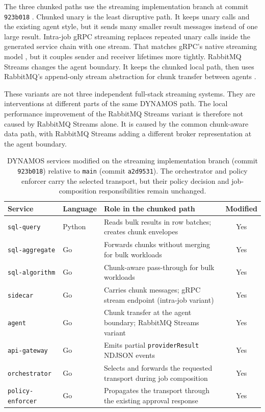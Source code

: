 The three chunked paths use the streaming implementation branch at commit \texttt{923b018} \cite{dynamosStreamingCommit2026}. Chunked unary is the least disruptive path. It keeps unary calls and the existing agent style, but it sends many smaller result messages instead of one large result. Intra-job gRPC streaming replaces repeated unary calls inside the generated service chain with one stream. That matches gRPC's native streaming model \cite{grpc2024coreconcepts}, but it couples sender and receiver lifetimes more tightly. RabbitMQ Streams changes the agent boundary. It keeps the chunked local path, then uses RabbitMQ's append-only stream abstraction for chunk transfer between agents \cite{rabbitmq2026streams}.

These variants are not three independent full-stack streaming systems. They are interventions at different parts of the same DYNAMOS path. The local performance improvement of the RabbitMQ Streams variant is therefore not caused by RabbitMQ Streams alone. It is caused by the common chunk-aware data path, with RabbitMQ Streams adding a different broker representation at the agent boundary.

\begin{table}[!htbp]
    \centering
    \footnotesize
    \caption{DYNAMOS services modified on the streaming implementation branch (commit \texttt{923b018}) relative to \texttt{main} (commit \texttt{a2d9531}). The orchestrator and policy enforcer carry the selected transport, but their policy decision and job-composition responsibilities remain unchanged.}
    \label{tab:services-modified}
    \setlength{\tabcolsep}{4pt}
    \begin{tabularx}{\textwidth}{llXc}
        \toprule
        Service & Language & Role in the chunked path & Modified \\
        \midrule
        \texttt{sql-query} & Python & Reads bulk results in row batches; creates chunk envelopes & Yes \\
        \texttt{sql-aggregate} & Go & Forwards chunks without merging for bulk workloads & Yes \\
        \texttt{sql-algorithm} & Go & Chunk-aware pass-through for bulk workloads & Yes \\
        \texttt{sidecar} & Go & Carries chunk messages; gRPC stream endpoint (intra-job variant) & Yes \\
        \texttt{agent} & Go & Chunk transfer at the agent boundary; RabbitMQ Streams variant & Yes \\
        \texttt{api-gateway} & Go & Emits partial \texttt{providerResult} NDJSON events & Yes \\
        \texttt{orchestrator} & Go & Selects and forwards the requested transport during job composition & Yes \\
        \texttt{policy-enforcer} & Go & Propagates the transport through the existing approval response & Yes \\
        \bottomrule
    \end{tabularx}
\end{table}
